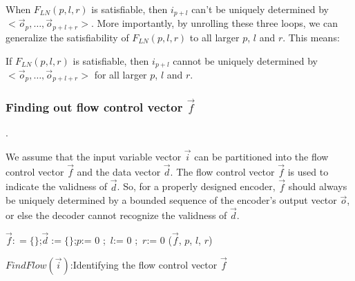 \documentclass[runningheads,a4paper,orivec]{llncs}
\begin{document}


When $F_{LN}(p,l,r)$ is satisfiable,
then $i_{p+l}$ can't be uniquely determined by $<\vec{o}_{p},\dots,\vec{o}_{p+l+r}>$.
More importantly,
by unrolling these three loops,
we can generalize the satisfiability of $F_{LN}(p,l,r)$ to all larger $p$, $l$ and $r$.
This means:


\begin{proposition}\label{prop_ln1}
If $F_{LN}(p,l,r)$ is satisfiable,
then $i_{p+l}$ cannot be uniquely determined by $<\vec{o}_{p},\dots,\vec{o}_{p+l+r}>$ for all larger $p$, $l$ and $r$.
\end{proposition}

\subsubsection{Finding out flow control vector $\vec{f}$}\label{subsubsec_findfc}.

We assume that the input variable vector $\vec{i}$ can be partitioned into 
the flow control vector $\vec{f}$ and the data vector $\vec{d}$.
The flow control vector $\vec{f}$ is used to indicate the validness of $\vec{d}$.
So,
for a properly designed encoder,
$\vec{f}$ should always be uniquely determined by a bounded sequence of the encoder's output vector $\vec{o}$,
or else the decoder cannot recognize the validness of $\vec{d}$.

\begin{algorithm}[t]
\SetAlgoVlined
{}
$\vec{f}: = \{\}$;$\vec{d}:= \{\}$;$p$:= 0 ;~$l$:= 0 ;~$r$:= 0 \;
\KwRet ($\vec{f}$, $p$, $l$, $r$)
\caption{$FindFlow(\vec{i})$:Identifying the flow control vector $\vec{f}$}
\label{alg_fofc}
\end{algorithm}
\end{document}
